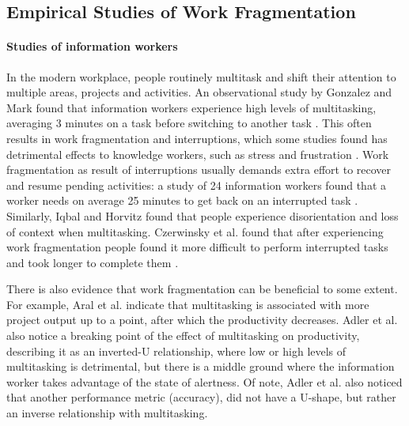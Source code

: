 \documentclass[times]{smrauth}
\begin{document}
\subsection{Empirical Studies of Work Fragmentation}

\paragraph{Studies of information workers}
In the modern workplace, people routinely multitask and shift their attention to multiple areas, projects and activities. An observational study by Gonzalez and Mark found that information workers experience high levels of multitasking, averaging 3 minutes on a task before switching to another task \cite{GM04}. This often results in work fragmentation and interruptions, which some studies found has detrimental effects to knowledge workers, such as stress and frustration \cite{MGK08}. Work fragmentation as result of interruptions usually demands extra effort to recover and resume pending activities: a study of 24 information workers found that a worker needs on average 25 minutes to get back on an interrupted task \cite{MGH05}. Similarly, Iqbal and Horvitz \cite{IH07} found that people experience disorientation and loss of context when multitasking. Czerwinsky et al. found that after experiencing work fragmentation people found it more difficult to perform interrupted tasks and took longer to complete them \cite{CHW04}. 

There is also evidence that work fragmentation can be beneficial to some extent. For example, Aral et al. \cite{ABV12} indicate that multitasking is associated with more project output up to a point, after which the productivity decreases. Adler et al. \cite{AB12} also notice a breaking point of the effect of multitasking on productivity, describing it as an inverted-U relationship, where low or high levels of multitasking is detrimental, but there is a middle ground where the information worker takes advantage of the state of alertness. Of note, Adler et al.  also noticed that another performance metric (accuracy), did not have a U-shape, but rather an inverse relationship with multitasking.
\end{document}

